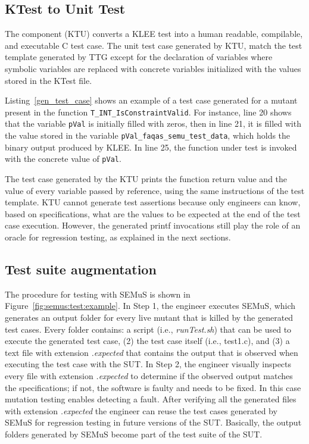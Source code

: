

\subsection{KTest to Unit Test}





The component  (KTU) converts a KLEE test into a human readable, compilable, and executable C test case. The unit test case generated by KTU, match the test template generated by TTG except for the declaration of variables where symbolic variables are replaced with concrete variables initialized with the values stored in the KTest file.
 
Listing~\ref{gen_test_case} shows an example of a test case generated for a mutant present in the function \texttt{T\_INT\_Is\-ConstraintValid}. For instance, line 20 shows that the variable \texttt{pVal} is initially filled with zeros, then in line 21, it is filled with the value stored in the variable \texttt{pVal\_faqas\_semu\_test\_data}, which holds the binary output produced by KLEE. In line 25, the function under test is invoked with the concrete value of \texttt{pVal}. 

The test case generated by the KTU prints the function return value and the value of every variable passed by reference, using the same instructions of the test template.
KTU cannot generate test assertions because only engineers can know, based on specifications, what are the values to be expected at the end of the test case execution.
However, the generated printf invocations still play the role of an oracle for regression testing, as explained in the next sections.

\subsection{Test suite augmentation} 

The procedure for testing with SEMuS is shown in Figure~\ref{fig:semus:test:example}.
In Step 1, the engineer executes SEMuS, which generates an output folder for every live mutant that is killed by the generated test cases.
Every folder contains: a script (i.e., \emph{runTest.sh}) that can be used to execute the generated test case, (2) the test case itself (i.e., test1.c), and (3) a text file with extension \emph{.expected} that contains the output that is observed when executing the test case with the SUT.
In Step 2, the engineer visually inspects every file with extension \emph{.expected} to determine if the observed output matches the specifications; if not, the software is faulty and needs to be fixed. In this case mutation testing enables detecting a fault. 
After verifying all the generated files with extension \emph{.expected} the engineer can reuse the test cases generated by SEMuS for regression testing in future versions of the SUT. Basically, the output folders generated by SEMuS become part of the test suite of the SUT.

